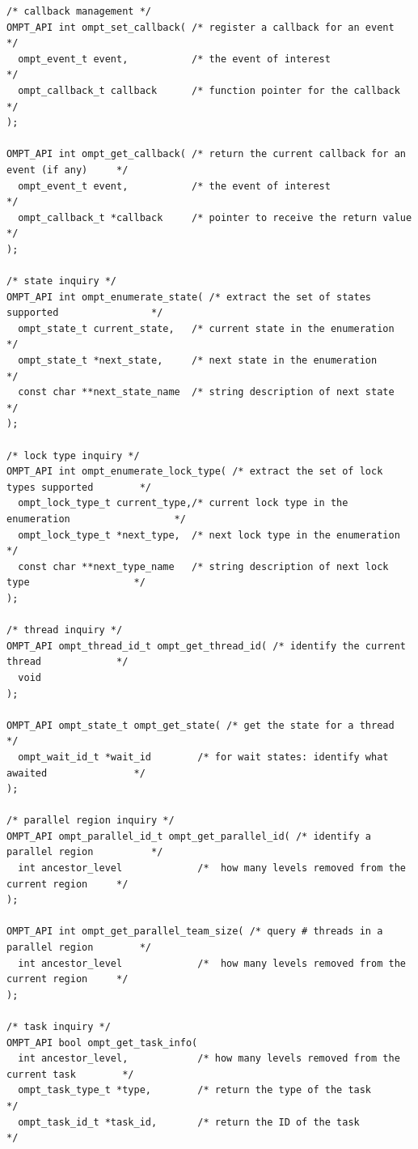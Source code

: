 \documentclass{article}
\begin{document}
{%
\begin{verbatim}
/* callback management */
OMPT_API int ompt_set_callback( /* register a callback for an event                      */
  ompt_event_t event,           /* the event of interest                                 */
  ompt_callback_t callback      /* function pointer for the callback                     */
);

OMPT_API int ompt_get_callback( /* return the current callback for an event (if any)     */
  ompt_event_t event,           /* the event of interest                                 */
  ompt_callback_t *callback     /* pointer to receive the return value                   */
);

/* state inquiry */
OMPT_API int ompt_enumerate_state( /* extract the set of states supported                */
  ompt_state_t current_state,   /* current state in the enumeration                      */
  ompt_state_t *next_state,     /* next state in the enumeration                         */
  const char **next_state_name  /* string description of next state                      */
);

/* lock type inquiry */
OMPT_API int ompt_enumerate_lock_type( /* extract the set of lock types supported        */
  ompt_lock_type_t current_type,/* current lock type in the enumeration                  */
  ompt_lock_type_t *next_type,  /* next lock type in the enumeration                     */
  const char **next_type_name   /* string description of next lock type                  */
);

/* thread inquiry */
OMPT_API ompt_thread_id_t ompt_get_thread_id( /* identify the current thread             */
  void
);

OMPT_API ompt_state_t ompt_get_state( /* get the state for a thread                      */
  ompt_wait_id_t *wait_id        /* for wait states: identify what awaited               */
);

/* parallel region inquiry */
OMPT_API ompt_parallel_id_t ompt_get_parallel_id( /* identify a parallel region          */
  int ancestor_level             /*  how many levels removed from the current region     */
);

OMPT_API int ompt_get_parallel_team_size( /* query # threads in a parallel region        */
  int ancestor_level             /*  how many levels removed from the current region     */
);

/* task inquiry */
OMPT_API bool ompt_get_task_info(
  int ancestor_level,            /* how many levels removed from the current task        */
  ompt_task_type_t *type,        /* return the type of the task                          */
  ompt_task_id_t *task_id,       /* return the ID of the task                            */
  

\end{verbatim}}
\end{document}
